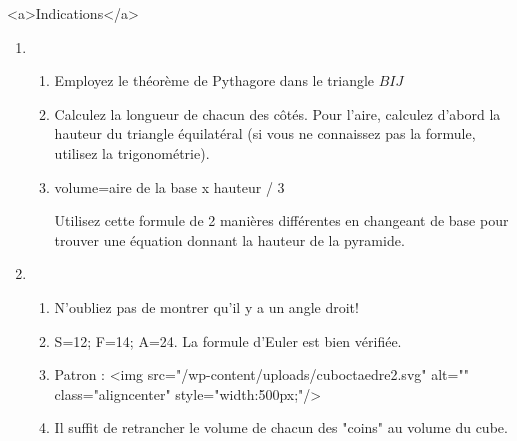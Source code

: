 \begin{corrige}
     \begin{h2}<a>Indications</a>\end{h2}
     \begin{enumerate}
          \item
          \begin{enumerate}
               \item
               Employez le théorème de Pythagore dans le triangle $BIJ$
               \item
               Calculez la longueur de chacun des côtés. Pour l'aire, calculez d'abord la hauteur du triangle équilatéral (si vous ne connaissez pas la formule, utilisez la trigonométrie).
               \item
               volume=aire de la base x hauteur / 3
               \par
               Utilisez cette formule de 2 manières différentes en changeant de base pour trouver une équation donnant la hauteur de la pyramide.
          \end{enumerate}
          \item
          \begin{enumerate}
               \item
               N'oubliez pas de montrer qu'il y a un angle droit!
               \item
               S=12; F=14; A=24. La formule d'Euler est bien vérifiée.
               \item
               Patron :
               <img src="/wp-content/uploads/cuboctaedre2.svg" alt="" class="aligncenter" style="width:500px;"/>
               \item
               Il suffit de retrancher le volume de chacun des "coins" au volume du cube.
          \end{enumerate}
     \end{enumerate}
\end{corrige}

